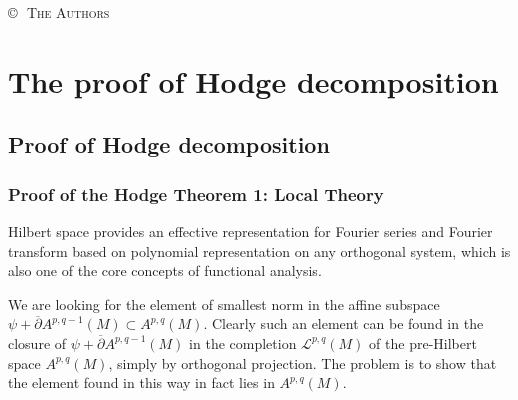 \documentclass[twoside,openany,12pt]{beautynote}
\author{Ethan Lu}
\begin{document}
\maketitle\clearpage
\copyrights
\pagestyle{\auxsettings}
\makeatletter
\thispagestyle{copyright}
\ifdefempty{\@faculty}{}{\noindent{\large\textsc{\@faculty}} \\}
\ifdefempty{\@university}{}{{\large\textsc{\@university}} \\[1em]}
\vfill
{}
\copyright\,\the\year\, \textsc{The Authors}
\doclicenseThis
\cleardoublepage
\makeatother
    \tableofcontents
\pagestyle{\defaultsettings}
\chapter{The proof of Hodge decomposition}
\section{Proof of Hodge decomposition}

\subsection{Proof of the Hodge Theorem 1: Local Theory}

Hilbert space provides an effective representation for Fourier series
and Fourier transform based on polynomial representation on any orthogonal
system, which is also one of the core concepts of functional analysis.

We are looking for the element of smallest norm in the affine subspace $\psi +
\overline{\partial} A^{p, q - 1} (M) \subset A^{p, q} (M)$. Clearly such an
element can be found in the closure of $\psi + \overline{\partial} A^{p, q -
1} (M)$ in the completion $\mathcal{L}^{p, q} (M) $ of the pre-Hilbert space
$A^{p, q} (M)$, simply by orthogonal projection. The problem is to show that
the element found in this way in fact lies in $A^{p, q} (M)$.
\end{document}
